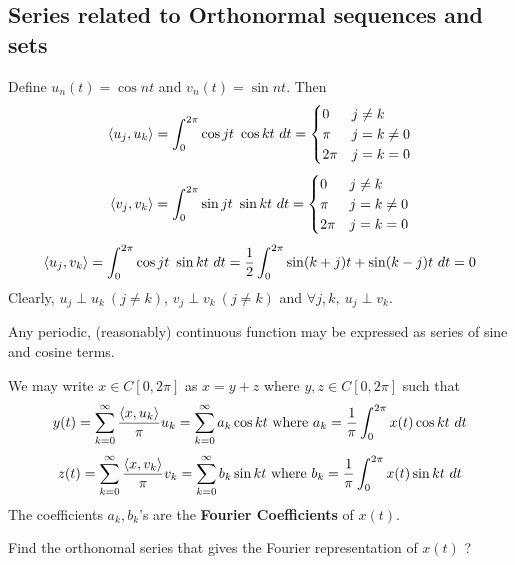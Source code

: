 \subsection{Series related to Orthonormal sequences and sets}
\begin{commentary}
\begin{remark}
	Define $u_n(t) = \cos nt$ and $v_n(t) = \sin nt$.
	Then
	\[ \left\langle u_j,u_k \right\rangle = \int_0^{2\pi} \cos jt \ \cos kt \ dt = \begin{cases} 0 & j \ne k \\ \pi & j=k \ne 0 \\ 2\pi & j = k = 0 \end{cases} \]
		\[ \left\langle v_j,v_k \right\rangle = \int_0^{2\pi} \sin jt \ \sin kt \ dt = \begin{cases} 0 & j \ne k \\ \pi & j=k \ne 0 \\ 2\pi & j = k = 0 \end{cases} \]
			\[ \left\langle u_j,v_k \right\rangle = \int_0^{2\pi} \cos jt \ \sin kt \ dt =  \frac{1}{2} \int_0^{2\pi} \sin (k+j)t + \sin (k-j)t \ dt = 0 \]
		Clearly, $u_j \perp u_k\ (j \ne k)$, $v_j \perp v_k\ (j \ne k)$ and $\forall j,k,\ u_j \perp v_k$.
\end{remark}

\begin{theorem}[Fourier]
	Any periodic, (reasonably) continuous function may be expressed as series of sine and cosine terms.
\end{theorem}
\begin{remark}
	We may write $x \in C[0,2\pi]$ as $x = y+z$ where $y,z \in C[0,2\pi]$ such that
	\[ y(t) 
	= \sum_{k=0}^\infty \frac{\inner{x}{u_k}}{\pi} u_k
	= \sum_{k=0}^\infty a_k \cos kt 
	\text{ where } a_k = \frac{1}{\pi} \int_0^{2\pi} x(t) \cos kt\ dt \]
	\[ z(t) 
	= \sum_{k=0}^\infty \frac{\inner{x}{v_k}}{\pi} v_k 
	= \sum_{k=0}^\infty b_k \sin kt 
	\text{ where } b_k = \frac{1}{\pi} \int_0^{2\pi} x(t) \sin kt \ dt \]
	The coefficients $a_k,b_k$'s are the \textbf{Fourier Coefficients} of $x(t)$.
\end{remark}
\end{commentary}

\begin{challenge}
	Find the orthonomal series that gives the Fourier representation of $x(t)$ ? \cite{apostol}
\end{challenge}

